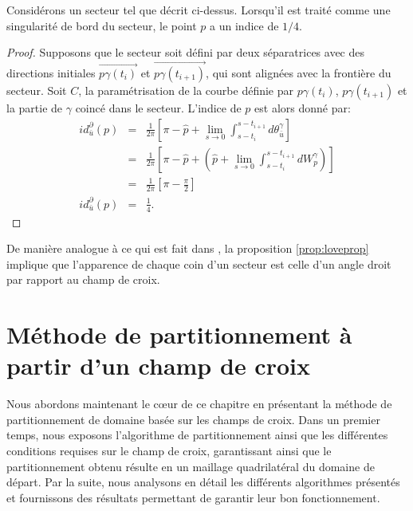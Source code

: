 \begin{proposition}
\label{prop:loveprop}
Considérons un secteur tel que décrit ci-dessus. Lorsqu'il est traité comme une singularité de bord du secteur, le point $p$ a un indice de $1/4$.
\end{proposition}

\begin{proof}
Supposons que le secteur soit défini par deux séparatrices avec des directions initiales $\overrightarrow{p\gamma(t_i)}$ et $\overrightarrow{p\gamma(t_{i+1})}$, qui sont alignées avec la frontière du secteur. Soit $C$, la paramétrisation de la courbe définie par $p\gamma(t_i)$, $p\gamma(t_{i+1})$ et la partie de $\gamma$ coincé dans le secteur. L'indice de $p$ est alors donné par:
\begin{eqnarray*}
id^\partial_{\bar{u}}(p)&=&\frac{1}{2\pi}\left[\pi-\hat{p}+\lim\limits_{s\rightarrow 0}\int_{s-t_i}^{s-t_{i+1}}d\theta_{\bar{u}}^\gamma\right]\\
&=&\frac{1}{2\pi}\left[\pi-\hat{p}+\left(\hat{p}+\lim\limits_{s\rightarrow 0}\int_{s-t_i}^{s-t_{i+1}}dW_p^\gamma\right)\right]\\
&=&\frac{1}{2\pi}\left[\pi-\frac{\pi}{2}\right]\\
id^\partial_{\bar{u}}(p)&=&\frac{1}{4}.
\end{eqnarray*}
\end{proof}

De manière analogue à ce qui est fait dans \cite{viertel2019approach}, la proposition \ref{prop:loveprop} implique que l'apparence de chaque coin d'un secteur est celle d'un angle droit par rapport au champ de croix.

\section{Méthode de partitionnement à partir d'un champ de croix}

Nous abordons maintenant le cœur de ce chapitre en présentant la méthode de partitionnement de domaine basée sur les champs de croix. Dans un premier temps, nous exposons l'algorithme de partitionnement ainsi que les différentes conditions requises sur le champ de croix, garantissant ainsi que le partitionnement obtenu résulte en un maillage quadrilatéral du domaine de départ. Par la suite, nous analysons en détail les différents algorithmes présentés et fournissons des résultats permettant de garantir leur bon fonctionnement.

